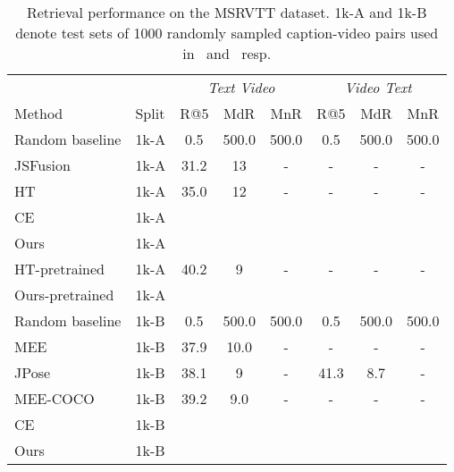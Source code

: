 \documentclass[runningheads]{llncs}
\begin{document}
\begin{table}[h!]
\begin{center}
\caption{Retrieval performance on the MSRVTT dataset. 1k-A and 1k-B denote test sets of 1000 randomly sampled caption-video pairs used in~\cite{Yu2018JSFusion} and~\cite{miech2018learning} resp.}
\label{table:MSRVTT_results}
\scriptsize
\begin{tabular}{l | l| @{\hskip -0.35cm}c @{\hskip -0.35cm}c @{\hskip -0.35cm}c | @{\hskip -0.35cm}c @{\hskip -0.35cm}c @{\hskip -0.35cm}c}
\hline
\multicolumn{1}{c}{} & \multicolumn{1}{c}{} & \multicolumn{3}{c}{\textit{Text  Video}} & \multicolumn{3}{c}{\textit{Video  Text}} \\
Method & Split & R@5 & MdR & MnR & R@5 & MdR & MnR \\
\hline
Random baseline & 1k-A & 0.5 & 500.0 & 500.0 & 0.5 & 500.0 & 500.0 \\
JSFusion~\cite{Yu2018JSFusion} & 1k-A & 31.2 & 13 & - & - & - & - \\
HT~\cite{miech19howto100m} & 1k-A & 35.0 & 12 & - & - & - & - \\
CE~\cite{liu2019use} & 1k-A &  &  &  &  &  &  \\
Ours & 1k-A &  &  &  &  &  &  \\
\hline
HT-pretrained~\cite{miech19howto100m} & 1k-A & 40.2 & 9 & - & - & - & - \\
Ours-pretrained & 1k-A &  &  &  &  &  &  \\
\hline\hline
Random baseline & 1k-B & 0.5 & 500.0 & 500.0 & 0.5 & 500.0 & 500.0 \\
MEE~\cite{miech2018learning} & 1k-B & 37.9 & 10.0 & - & - & - & - \\
JPose~\cite{wray2019finegrained} & 1k-B & 38.1 & 9 & - & 41.3 & 8.7 & - \\
MEE-COCO~\cite{miech2018learning} & 1k-B & 39.2 & 9.0 & - & - & - & - \\
CE~\cite{liu2019use} & 1k-B &  &  &  &  &  &  \\
Ours & 1k-B &  &  &  &  &  &  \\
\hline
\end{tabular}
\end{center}
\end{table}
\end{document}
